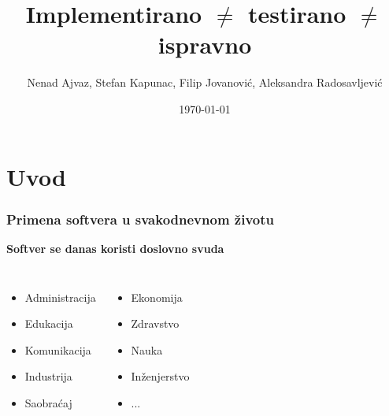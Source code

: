 \documentclass{beamer}
\title[Pouzdanost Softvera]{Implementirano $\neq$ testirano $\neq$ ispravno} %
\author{Nenad Ajvaz, Stefan Kapunac, Filip Jovanović, Aleksandra Radosavljević} %
\institute[MATF] %
{
Univerzitet u Beogradu, Matematički Fakultet \\ %
\medskip
}
\date{\today} %
\begin{document}
\begin{frame}
\titlepage %
\end{frame}




\section{Uvod}
\begin{frame}
\frametitle{Primena softvera u svakodnevnom životu}
\textbf{Softver se danas koristi doslovno svuda}

\begin{columns}[c] %
\begin{itemize}
\item Administracija
\item Edukacija
\item Komunikacija
\item Industrija
\item Saobraćaj
\end{itemize}

\begin{itemize}
\item Ekonomija
\item Zdravstvo
\item Nauka
\item Inženjerstvo
\item ...
\end{itemize}
\end{columns}
\end{frame}
\end{document}
